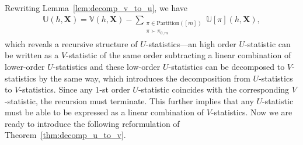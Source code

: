 \documentclass[letterpaper,11pt]{article}
\newcommand{\ustat}{\mathbb{U}}
\newcommand{\vstat}{\mathbb{V}}
\newcommand{\partition}{\mathrm{Partition}}
\newcommand{\partitionp}[1]{\partition(#1)}
\newcommand{\pgreater}{\succ}
\begin{document}
Rewriting Lemma~\ref{lem:decomp_v_to_u}, we have
\begin{align}
    \ustat(h,\bm{X}) = \vstat( h, \bm{X}) 
    - \sum_{\substack{ \pi \in \partitionp{[m]} \\ \pi \pgreater \pi_{0,m}}} \ustat[\pi](h, \bm{X}), 
\end{align}
which reveals a recursive structure of $U$-statistics---an high order $U$-statistic can be written as a $V$-statistic of the same order subtracting a linear combination of lower-order $U$-statistics and these low-order $U$-statistics can be decomposed to $V$-statistics by the same way, which introduces the decomposition from $U$-statistics to $V$-statistics. Since any $1$-st order $U$-statistic coincides with the corresponding $V$-statistic, the recursion must terminate. This further implies that any $U$-statistic must be able to be expressed as a linear combination of $V$-statistics. Now we are ready to introduce the following reformulation of Theorem~\ref{thm:decomp_u_to_v}.
\end{document}
